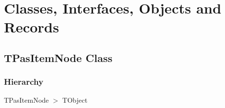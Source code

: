 \documentclass{report}
\newif\ifpdf
\begin{document}
\section{Classes, Interfaces, Objects and Records}
\ifpdf
\subsection*{\large{\textbf{TPasItemNode Class}}\normalsize\hspace{1ex}\hrulefill}
\else
\subsection*{TPasItemNode Class}
\fi
\label{PasDoc_HierarchyTree.TPasItemNode}
\subsubsection*{\large{\textbf{Hierarchy}}\normalsize\hspace{1ex}\hfill}
TPasItemNode {$>$} TObject
\end{document}
